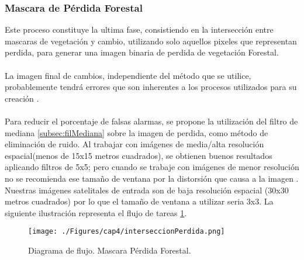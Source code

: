 \subsubsection{Mascara de P\'erdida Forestal}
Este proceso constituye la ultima fase, consistiendo en la intersecci\'on entre mascaras de vegetaci\'on y cambio, utilizando solo aquellos pixeles que representan perdida, para generar una imagen binaria de perdida de vegetaci\'on Forestal.\\~\\
La imagen final de cambios, independiente del método que se utilice, probablemente tendrá errores que son inherentes a los procesos utilizados para su creación \cite{lovell2001filtering}. \\~\\
Para reducir el porcentaje de falsas alarmas, se propone la utilización del filtro de mediana \ref{subsec:filMediana} sobre la imagen de perdida, como m\'etodo de eliminación de ruido. Al trabajar con im\'agenes de media/alta resoluci\'on espacial(menos de 15x15 metros cuadrados), se obtienen buenos resultados aplicando filtros de 5x5; pero cuando se trabaje con im\'agenes de menor resoluci\'on no se recomienda ese tama\~{n}o de ventana por la distorsi\'on que causa a la imagen \cite{martinez2013normalizacion}. Nuestras im\'agenes satelitales de entrada son de baja resoluci\'on espacial (30x30 metros cuadrados) por lo que el tama\~{n}o de ventana a utilizar seria 3x3.
La siguiente ilustraci\'on representa el flujo de tareas \ref{fig:intersPerdida}.
\begin{figure}[H]
	\centering
	\texttt{[image: ./Figures/cap4/interseccionPerdida.png]}
	\caption{Diagrama de flujo. Mascara P\'erdida Forestal.}
	\label{fig:intersPerdida}
\end{figure}

